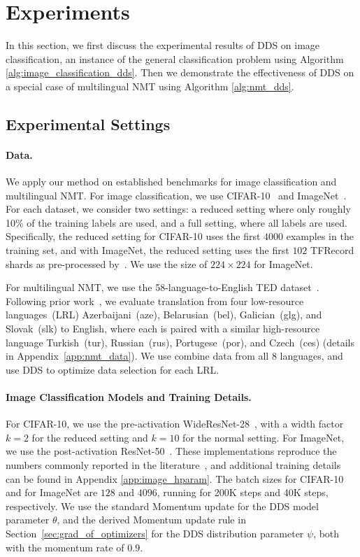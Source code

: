 \section{\label{sec:experiment}Experiments}
In this section, we first discuss the experimental results of DDS on image classification, an instance of the general classification problem using Algorithm \ref{alg:image_classification_dds}. Then we demonstrate the effectiveness of DDS on a special case of multilingual NMT using Algorithm \ref{alg:nmt_dds}.

\subsection{\label{exp:settings}Experimental Settings}

\paragraph{Data.} We apply our method on established benchmarks for image classification and multilingual NMT.
For image classification, we use CIFAR-10~\citep{cifar10} and ImageNet~\citep{imagenet}. For each dataset, we consider two settings: a reduced setting where only roughly 10\% of the training labels are used, and a full setting, where all labels are used. Specifically, the reduced setting for CIFAR-10 uses the first $4000$ examples in the training set, and with ImageNet, the reduced setting uses the first $102$ TFRecord shards as pre-processed by~\citet{imagenet_generalize_better}. We use the size of $224 \times 224$ for ImageNet.

For multilingual NMT, we use the 58-language-to-English TED dataset~\citep{ted_pretrain_emb}. 
Following prior work~\citep{ted_pretrain_emb,rapid_adapt_nmt,SDE}, we evaluate translation from four low-resource languages~(LRL) Azerbaijani~(aze), Belarusian~(bel), Galician~(glg), and Slovak~(slk) to English, where each is paired with a similar high-resource language Turkish~(tur), Russian~(rus), Portugese~(por), and Czech~(ces) (details in Appendix~\ref{app:nmt_data}).
We use combine data from all 8 languages, and use DDS to optimize data selection for each LRL. 

\paragraph{Image Classification Models and Training Details.}
For CIFAR-10, we use the pre-activation WideResNet-28~\citep{wide_res_net}, with a width factor $k=2$ for the reduced setting and $k=10$ for the normal setting. For ImageNet, we use the post-activation ResNet-50~\citep{res_net}.
These implementations reproduce the numbers commonly reported in the literature~\citep{wide_res_net,res_net,resnext}, and additional training details can be found in Appendix \ref{app:image_hparam}.
The batch sizes for CIFAR-10 and for ImageNet are $128$ and $4096$, running for 200K steps and 40K steps, respectively. We use the standard Momentum update for the DDS model parameter $\theta$, and the derived Momentum update rule in Section~\ref{sec:grad_of_optimizers} for the DDS distribution parameter $\psi$, both with the momentum rate of $0.9$.

